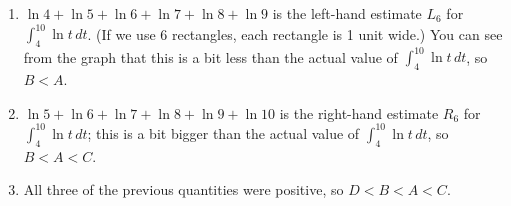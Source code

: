 \documentclass{article}
\begin{document}
\begin{enumerate}
\begin{solution}
\begin{enumerate}[label=\Alph*.]
    \item $\displaystyle \ln 4 + \ln 5 + \ln 6 + \ln 7 + \ln 8 + \ln 9$ is
      the left-hand estimate $L_6$ for $\displaystyle \int_4^{10} \ln
      t\,dt$.  (If we use 6 rectangles, each rectangle is 1 unit wide.)
      You can see from the graph that this is a bit less than the actual
      value of $\displaystyle \int_4^{10} \ln t\,dt$, so $B < A$.

    \item $\displaystyle \ln 5 + \ln 6 + \ln 7 + \ln 8 + \ln 9 + \ln 10$
      is the right-hand estimate $R_6$ for $\displaystyle \int_4^{10} \ln
      t\,dt$; this is a bit bigger than the actual value of $\displaystyle
      \int_4^{10} \ln t\,dt$, so $B < A < C$.

    \item All three of the previous quantities were positive, so $D < B <
      A < C$. 


\end{enumerate}
\end{solution}
\end{enumerate}
\end{document}
